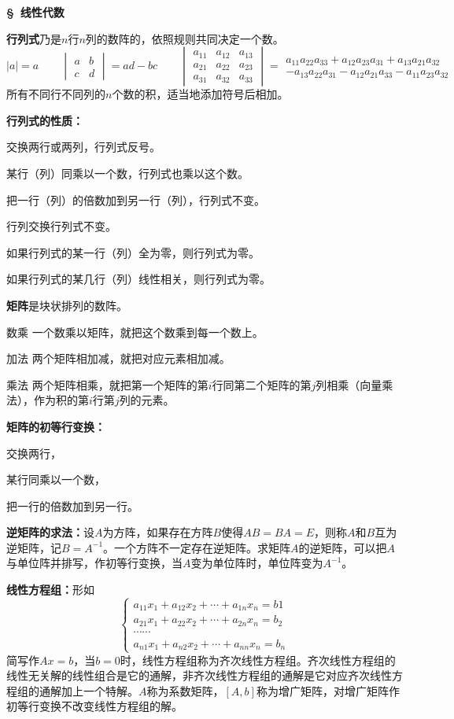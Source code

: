 \documentclass[a4paper,11pt,oneside,fleqn]{article}
\renewcommand{\section}[1]{\stepcounter{sectioni}\begin{center}{\zihao{4}\bfseries \S\arabic{sectioni}\ #1}\end{center}\par}\newcounter{sectioni}
\newcommand{\cu}[1]{\par\vspace{1ex}\textbf{#1}}\newcommand{\qspace}{\underline{\qquad\quad}}\newcommand{\qlim}[2][x\to]{\Dd \lim_{#1#2}}
\begin{document}
\section{线性代数}
\cu{行列式}乃是$n$行$n$列的数阵的，依照规则共同决定一个数。
$$|a|=a\qquad\begin{vmatrix}a&b\\c&d\end{vmatrix}=ad-bc\qquad\begin{vmatrix}a_{11}&a_{12}&a_{13}\\a_{21}&a_{22}&a_{23}\\a_{31}&a_{32}&a_{33}\end{vmatrix}=\begin{array}{l}a_{11}a_{22}a_{33}+a_{12}a_{23}a_{31}+a_{13}a_{21}a_{32}\\-a_{13}a_{22}a_{31}-a_{12}a_{21}a_{33}-a_{11}a_{23}a_{32}\end{array}$$
所有不同行不同列的$n$个数的积，适当地添加符号后相加。
\cu{行列式的性质：}
\begin{compactenum}
\item 交换两行或两列，行列式反号。
\item 某行（列）同乘以一个数，行列式也乘以这个数。
\item 把一行（列）的倍数加到另一行（列），行列式不变。
\item 行列交换行列式不变。
\item 如果行列式的某一行（列）全为零，则行列式为零。
\item 如果行列式的某几行（列）线性相关，则行列式为零。
\end{compactenum}
\cu{矩阵}是块状排列的数阵。
\begin{compactdesc}
\item[数乘]一个数乘以矩阵，就把这个数乘到每一个数上。
\item[加法]两个矩阵相加减，就把对应元素相加减。
\item[乘法]两个矩阵相乘，就把第一个矩阵的第$i$行同第二个矩阵的第$j$列相乘（向量乘法），作为积的第$i$行第$j$列的元素。
\end{compactdesc}
\cu{矩阵的初等行变换：}\begin{inparaenum}
\item 交换两行，
\item 某行同乘以一个数，
\item 把一行的倍数加到另一行。
\end{inparaenum}
\cu{逆矩阵的求法：}设$A$为方阵，如果存在方阵$B$使得$AB=BA=E$，则称$A$和$B$互为逆矩阵，记$B=A^{-1}$。一个方阵不一定存在逆矩阵。求矩阵$A$的逆矩阵，可以把$A$与单位阵并排写，作初等行变换，当$A$变为单位阵时，单位阵变为$A^{-1}$。
\cu{线性方程组：}形如$$\begin{cases}a_{11}x_1+a_{12}x_2+\cdots+a_{1n}x_n=b1\\a_{21}x_1+a_{22}x_2+\cdots+a_{2n}x_n=b_2\\\cdots\cdots\\a_{n1}x_1+a_{n2}x_2+\cdots+a_{nn}x_n=b_n\end{cases}$$
简写作$Ax=b$，当$b=0$时，线性方程组称为齐次线性方程组。齐次线性方程组的线性无关解的线性组合是它的通解，非齐次线性方程组的通解是它对应齐次线性方程组的通解加上一个特解。$A$称为系数矩阵，$[A,b]$称为增广矩阵，对增广矩阵作初等行变换不改变线性方程组的解。
\end{document}
